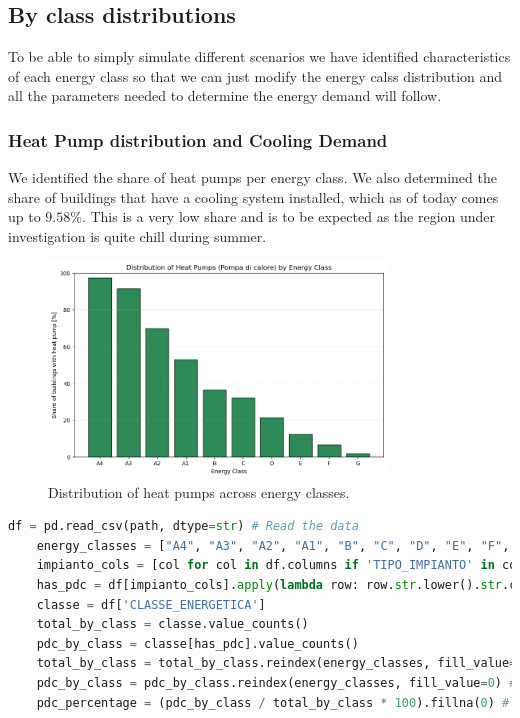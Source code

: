 \subsection{By class distributions}
To be able to simply simulate different scenarios we have identified characteristics of each energy class 
so that we can just modify the energy calss distribution and all the parameters needed to determine the energy demand will follow.

\subsubsection{Heat Pump distribution and Cooling Demand}
We identified the share of heat pumps per energy class.
We also determined the share of buildings that have a cooling system installed, which as of today comes up to $9.58\%$. 
This is a very low share and is to be expected as the region under investigation is quite chill during summer.

\begin{figure}[H]
    \centering
    \includegraphics[width=0.8\textwidth]{figures/1_heat-pump-share.png}
    \caption{Distribution of heat pumps across energy classes.}
    \label{fig:heat_pump_distribution}
\end{figure}

\begin{lstlisting}[language=python, caption={Code to extract heat pump data from the CENED database.}, label={lst:heat_pump_query}]
    df = pd.read_csv(path, dtype=str) # Read the data
    energy_classes = ["A4", "A3", "A2", "A1", "B", "C", "D", "E", "F", "G"]
    impianto_cols = [col for col in df.columns if 'TIPO_IMPIANTO' in col]
    has_pdc = df[impianto_cols].apply(lambda row: row.str.lower().str.contains('pompa di calore', na=False).any(), axis=1)
    classe = df['CLASSE_ENERGETICA']
    total_by_class = classe.value_counts()
    pdc_by_class = classe[has_pdc].value_counts()
    total_by_class = total_by_class.reindex(energy_classes, fill_value=0)
    pdc_by_class = pdc_by_class.reindex(energy_classes, fill_value=0) # Reorder by class
    pdc_percentage = (pdc_by_class / total_by_class * 100).fillna(0) # Calculate share
\end{lstlisting}

